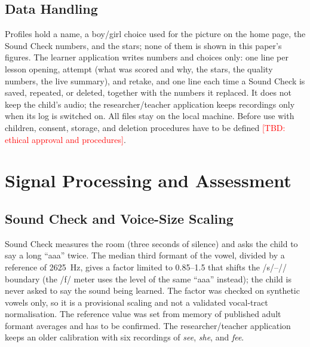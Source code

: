 \documentclass[conference]{IEEEtran}
\newcommand{\tbd}[1]{\textcolor{red}{[TBD: #1]}}
\newcommand{\ipa}[1]{/#1/}
\begin{document}
\subsection{Data Handling}
Profiles hold a name, a boy/girl choice used for the picture on the home page, the Sound Check numbers, and the stars; none of them is shown in this paper's figures. The learner application writes numbers and choices only: one line per lesson opening, attempt (what was scored and why, the stars, the quality numbers, the live summary), and retake, and one line each time a Sound Check is saved, repeated, or deleted, together with the numbers it replaced. It does not keep the child's audio; the researcher/teacher application keeps recordings only when its log is switched on. All files stay on the local machine. Before use with children, consent, storage, and deletion procedures have to be defined \tbd{ethical approval and procedures}.

\section{Signal Processing and Assessment}\label{sec:assess}
\subsection{Sound Check and Voice-Size Scaling}\label{sec:soundcheck}
Sound Check measures the room (three seconds of silence) and asks the child to say a long ``aaa'' twice. The median third formant of the vowel, divided by a reference of 2625~Hz, gives a factor limited to 0.85--1.5 that shifts the \ipa{s}--\ipa{\textesh} boundary (the \ipa{f} meter uses the level of the same ``aaa'' instead); the child is never asked to say the sound being learned. The factor was checked on synthetic vowels only, so it is a provisional scaling and not a validated vocal-tract normalisation. The reference value was set from memory of published adult formant averages and has to be confirmed. The researcher/teacher application keeps an older calibration with six recordings of \textit{see}, \textit{she}, and \textit{fee}.
\end{document}
